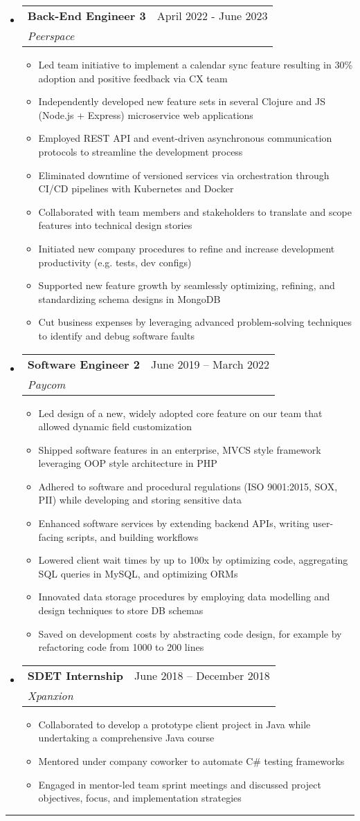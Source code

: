 \documentclass[letterpaper,11pt]{article}
\makeatletter
\newcommand{\resumeItem}[1]{
  \item\small{
    {#1 \vspace{-2pt}}
  }
}
\newcommand{\resumeSubheading}[4]{
  \vspace{-2pt}\item
    \begin{tabular*}{0.97\textwidth}[t]{l@{\extracolsep{\fill}}r}
      \textbf{#1} & #2 \\
      \textit{\small#3} & \textit{\small #4} \\
    \end{tabular*}\vspace{0pt}
}
\newcommand{\resumeSubHeadingListStart}{\begin{itemize}[leftmargin=0.15cm, label={}]}
\newcommand{\resumeSubHeadingListEnd}{\end{itemize}}
\newcommand{\resumeItemListStart}{\begin{itemize}}
\newcommand{\resumeItemListEnd}{\end{itemize}\vspace{-5pt}}
\makeatother
\begin{document}
\resumeSubHeadingListStart
\resumeSubheading
{Back-End Engineer 3}{April 2022 - June 2023}
{Peerspace}{}
\resumeItemListStart
\resumeItem{ Led team initiative to implement a calendar sync feature resulting in 30\% adoption and positive feedback via CX team}
\resumeItem{ Independently developed new feature sets in several Clojure and JS (Node.js + Express) microservice web applications}
\resumeItem{ Employed REST API and event-driven asynchronous communication protocols to streamline the development process}
\resumeItem{ Eliminated downtime of versioned services via orchestration through CI/CD pipelines with Kubernetes and Docker }
\resumeItem{ Collaborated with team members and stakeholders to translate and scope features into technical design stories}
\resumeItem{ Initiated new company procedures to refine and increase development productivity (e.g. tests, dev configs)}
\resumeItem{ Supported new feature growth by seamlessly optimizing, refining, and standardizing schema designs in MongoDB}
\resumeItem{ Cut business expenses by leveraging advanced problem-solving techniques to identify and debug software faults}
\resumeItemListEnd
\resumeSubHeadingListEnd

\resumeSubHeadingListStart
\resumeSubheading
{Software Engineer 2}{June 2019 – March 2022}
{Paycom}{}
\resumeItemListStart
\resumeItem{ Led design of a new, widely adopted core feature on our team that allowed dynamic field customization }
\resumeItem{ Shipped software features in an enterprise, MVCS style framework leveraging OOP style architecture in PHP}
\resumeItem{ Adhered to software and procedural regulations (ISO 9001:2015, SOX, PII) while developing and storing sensitive data }
\resumeItem{ Enhanced software services by extending backend APIs, writing user-facing scripts, and building workflows }
\resumeItem{ Lowered client wait times by up to 100x by optimizing code, aggregating SQL queries in MySQL, and optimizing ORMs }
\resumeItem{ Innovated data storage procedures by employing data modelling and design techniques to store DB schemas }
\resumeItem{ Saved on development costs by abstracting code design, for example by refactoring code from 1000 to 200 lines }
\resumeItemListEnd
\resumeSubHeadingListEnd
\resumeSubHeadingListStart
\resumeSubheading
{SDET Internship}{June 2018 – December 2018}
{Xpanxion}{}
\resumeItemListStart
\resumeItem{ Collaborated to develop a prototype client project in Java while undertaking a comprehensive Java course }
\resumeItem{ Mentored under company coworker to automate C\# testing frameworks }
\resumeItem{ Engaged in mentor-led team sprint meetings and discussed project objectives, focus, and implementation strategies }
\resumeItemListEnd
\resumeSubHeadingListEnd
\noindent\rule{19.5cm}{0.4pt}
\end{document}
